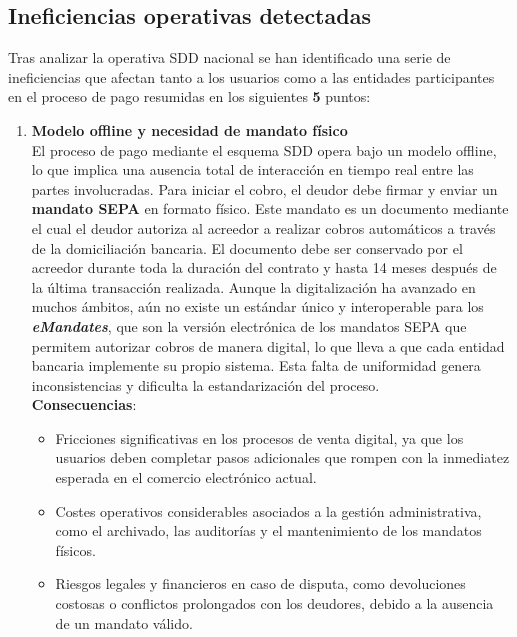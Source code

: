 \subsection{Ineficiencias operativas detectadas}
\label{subsec:ineficiencias}

Tras analizar la operativa SDD nacional se han identificado una serie de ineficiencias que afectan tanto a los usuarios como a las entidades participantes en el proceso de pago resumidas en los siguientes \textbf{5} puntos:
\begin{enumerate}[label=\textbf{\arabic*.}, leftmargin=0.75cm]
      \item \textbf{Modelo offline y necesidad de mandato físico}\\
            El proceso de pago mediante el esquema SDD opera bajo un modelo offline, lo que implica una ausencia total de interacción en tiempo real entre las partes involucradas. Para iniciar el cobro, el deudor debe firmar y enviar un \textbf{mandato SEPA} en formato físico. Este mandato es un documento mediante el cual el deudor autoriza al acreedor a realizar cobros automáticos a través de la domiciliación bancaria. El documento debe ser conservado por el acreedor durante toda la duración del contrato y hasta 14 meses después de la última transacción realizada. Aunque la digitalización ha avanzado en muchos ámbitos, aún no existe un estándar único y interoperable para los \textit{\textbf{eMandates}}, que son la versión electrónica de los mandatos SEPA que permitem autorizar cobros de manera digital, lo que lleva a que cada entidad bancaria implemente su propio sistema. Esta falta de uniformidad genera inconsistencias y dificulta la estandarización del proceso.\\
            \textbf{Consecuencias}:
      \begin{itemize}
            \item Fricciones significativas en los procesos de venta digital, ya que los usuarios deben completar pasos adicionales que rompen con la inmediatez esperada en el comercio electrónico actual.
            \item Costes operativos considerables asociados a la gestión administrativa, como el archivado, las auditorías y el mantenimiento de los mandatos físicos.
            \item Riesgos legales y financieros en caso de disputa, como devoluciones costosas o conflictos prolongados con los deudores, debido a la ausencia de un mandato válido.
      \end{itemize}


\end{enumerate}
